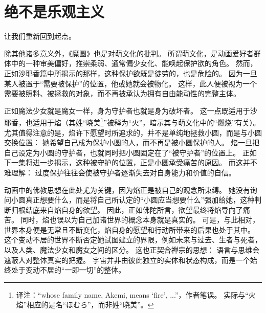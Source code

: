 \chapter[绝不是乐观主义]{绝不是乐观主义}



让我们重新回到起点。

除其他诸多意义外，《魔圆》也是对萌文化的批判。
所谓萌文化，是动画爱好者群体中的一种审美偏好，推崇柔弱、通常偏少女化、能唤起保护欲的角色。
然而，正如沙耶香篇中所揭示的那样，这种保护欲既是徒劳的，也是危险的。
因为一旦某人被置于“需要被保护”的位置，他或她就会被物化。
这样，此人便被视为一个需要被照料、被拯救的对象，而不再被承认为拥有自由能动性的完整主体。

正如魔法少女就是魔女一样，身为守护者也就是身为破坏者。
这一点既适用于沙耶香，也适用于焰（其姓“晓美\footnote{%
    译注：``whose family name, Akemi, means `fire', ...''，作者笔误。
    实际与“火焰”相应的是名“ほむら”，而非姓“晓美”。
}”被释为“火”，暗示其与萌文化中的“燃烧”有关）。
尤其值得注意的是，焰许下愿望时所追求的，并不是单纯地拯救小圆，而是与小圆交换位置：
她希望自己成为保护小圆的人，而不再是被小圆保护的人。
焰一旦把自己设定为小圆的守护者，也就同时把小圆固定在了“被守护者”的位置上。
正如下一集将进一步揭示，这种被守护的位置，正是小圆承受痛苦的原因。
而这并不难理解：
过度保护往往会使被守护者逐渐失去对自身能力和价值的自信。

动画中的佛教思想在此处尤为关键，因为焰正是被自己的观念所束缚。
她没有询问小圆真正想要什么，而是将自己所认定的“小圆应当想要什么”强加给她，这种判断归根结底来自焰自身的欲望。
因此，正如佛陀所言，欲望最终将焰导向了痛苦\cite{smart1998buddhism}。
同时，焰也误以为自己加诸世界的概念本身就是真实的。
可是，与此相对，世界本身便是无常且不断变化，焰自身的愿望和行动所带来的后果也处于其中。
这个变动不居的世界不断否定她试图建立的界限，例如未来与过去、生者与死者，以及人类、魔法少女和魔女之间的区分。
这也正契合禅宗的思想：
语言与思维会遮蔽人对整体真实的把握。
宇宙并非由彼此独立的实体和状态构成，而是一个始终处于变动不居的“一即一切”的整体\cite{smart1998formation-zen}。

